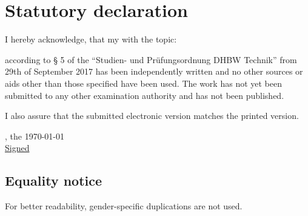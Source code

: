 \chapter*{Statutory declaration}
I hereby acknowledge, that my \arbeit{} with the topic:
\begin{quote}
	\textit{\titel}
\end{quote}
according to § 5 of the \enquote{Studien- und Prüfungsordnung DHBW Technik} from 29th of September 2017 has been independently written and no other sources or aids other than those specified have been used. The work has not yet been submitted to any other examination authority and has not been published.

\vspace{0.25cm}

I also assure that the submitted electronic version matches the printed version.

\vspace{1cm}

\verfassungsort, the \today \\[0.5cm]
{\underline{Signed \autor}}
{\makebox[6cm]{\hrulefill}}\\
\autorReverse

\vspace*{\fill}

\section*{Equality notice}

For better readability, gender-specific duplications are not used.